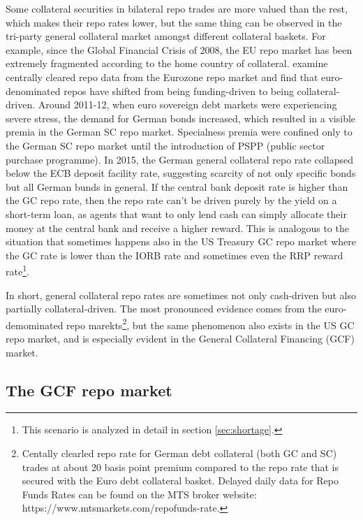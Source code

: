 \documentclass[11pt,a4paper,english,oneside]{article}
\begin{document}
Some collateral securities in bilateral repo trades are more valued than the rest, which makes their repo rates lower, but the same thing can be observed in the tri-party general collateral market amongst different collateral baskets. For example, since the Global Financial Crisis of 2008, the EU repo market has been extremely fragmented according to the home country of collateral. \citet{schaffner2019} examine centrally cleared repo data from the Eurozone repo market and find that euro-denominated repos have shifted from being funding-driven to being collateral-driven. Around 2011-12, when euro sovereign debt markets were experiencing severe stress, the demand for German bonds increased, which resulted in a visible premia in the German SC repo market. Specialness premia were confined only to the German SC repo market until the introduction of PSPP (public sector purchase programme). In 2015, the German general collateral repo rate collapsed below the ECB deposit facility rate, suggesting scarcity of not only specific bonds but all German bunds in general. If the central bank deposit rate is higher than the GC repo rate, then the repo rate can't be driven purely by the yield on a short-term loan, as agents that want to only lend cash can simply allocate their money at the central bank and receive a higher reward. This is analogous to the situation that sometimes happens also in the US Treasury GC repo market where the GC rate is lower than the IORB rate and sometimes even the RRP reward rate\footnote{This scenario is analyzed in detail in section \ref{sec:shortage}.}.

In short, general collateral repo rates are sometimes not only cash-driven but also partially collateral-driven. The most pronounced evidence comes from the euro-demominated repo marekts\footnote{Centally clearled repo rate for German debt collateral (both GC and SC) trades at about 20 basis point premium compared to the repo rate that is secured with the Euro debt collateral basket. Delayed daily data for Repo Funds Rates can be found on the MTS broker website: https://www.mtsmarkets.com/repofunds-rate.}, but the same phenomenon also exists in the US GC repo market, and is especially evident in the General Collateral Financing (GCF) market.


\subsection{The GCF repo market}
\end{document}
